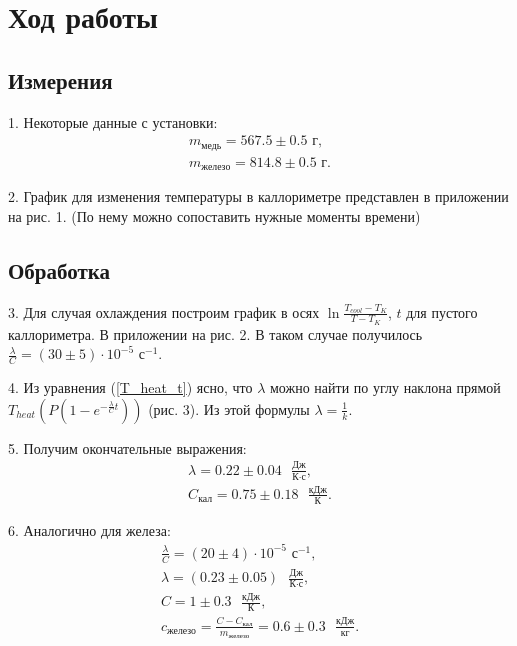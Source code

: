 \section{Ход работы}
\subsection{Измерения}

1. Некоторые данные с установки:
\begin{align*}
    m_\text{медь} = 567.5 \pm 0.5 \text{ г}, \\
    m_\text{железо} = 814.8 \pm 0.5 \text{ г}.
\end{align*}

2. График для изменения температуры в каллориметре представлен в приложении на рис. 1.%
(По нему можно сопоставить нужные моменты времени)

\subsection{Обработка}

3. Для случая охлаждения построим график в осях $\ln\frac{T_{cool} - T_K}{T - T_K}$, $t$ для пустого каллориметра. В приложении на рис. 2. %
В таком случае получилось $\frac \lambda C = (30 \pm 5) \cdot 10^{-5} \text{ с}^{-1}$.

4. Из уравнения (\ref{T_heat_t}) ясно, что $\lambda$ можно найти по углу наклона прямой $T_{heat}\left(P(1 - e^{- \frac{\lambda}{C} t})\right)$ (рис. 3). Из этой формулы $\lambda = \frac{1}{k}$.

5. Получим окончательные выражения:
\begin{align*}
    \lambda = 0.22 \pm 0.04 \text{ }\frac{\text{Дж}}{\text{К}\cdot\text{с}}, \\
    C_\text{кал} = 0.75 \pm 0.18 \text{ }\frac{\text{кДж}}{\text{К}}.
\end{align*}

6. Аналогично для железа:
\begin{align*}
    \frac \lambda C = (20 \pm 4) \cdot 10^{-5} \text{ с}^{-1}, \\
    \lambda = (0.23 \pm 0.05) \text{ }\frac{\text{Дж}}{\text{К}\cdot\text{с}}, \\
    C = 1 \pm 0.3  \text{ }\frac{\text{кДж}}{\text{К}}, \\
    c_\text{железо} = \frac{C - C_\text{кал}}{m_\text{железо}} = 0.6 \pm 0.3 \text{ } \frac{\text{кДж}}{\text{кг}}. \\
\end{align*}

